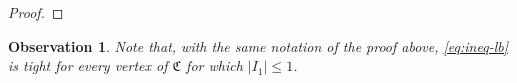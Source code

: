 \documentclass{article}
\newtheorem{observation}[theorem]{Observation}
\begin{document}
\begin{proof}
	\end{proof}
	\begin{observation}
		Note that, with the same notation of the proof above, \eqref{eq:ineq-lb} is tight for every vertex of \(\mathfrak{C}\) for which \(|I_1| \leq 1\).
	\end{observation}
\end{document}
